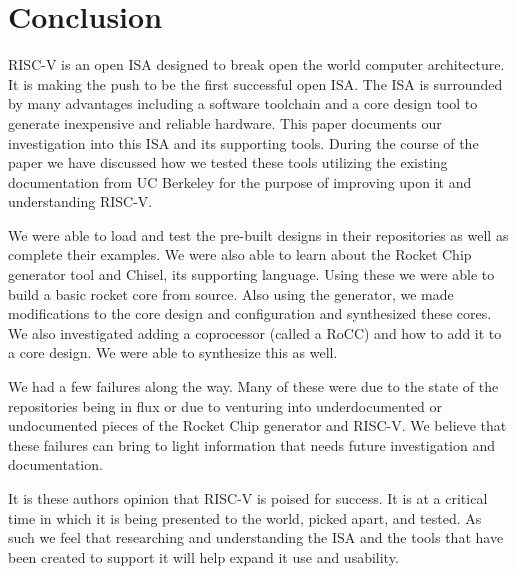 \documentclass[journal]{IEEEtran}
\begin{document}

\section{Conclusion}
RISC-V is an open ISA designed to break open the world computer architecture. It is making the push to be the first successful open ISA. The ISA is surrounded by many advantages including a software toolchain and a core design tool to generate inexpensive and reliable hardware. This paper documents our investigation into this ISA and its supporting tools. During the course of the paper we have discussed how we tested these tools utilizing the existing documentation from UC Berkeley for the purpose of improving upon it and understanding RISC-V.

We were able to load and test the pre-built designs in their repositories as well as complete their examples. We were also able to learn about the Rocket Chip generator tool and Chisel, its supporting language. Using these we were able to build a basic rocket core from source. Also using the generator, we made modifications to the core design and configuration and synthesized these cores. We also investigated adding a coprocessor (called a RoCC) and how to add it to a core design. We were able to synthesize this as well. 

We had a few failures along the way. Many of these were due to the state of the repositories being in flux or due to venturing into underdocumented or undocumented pieces of the Rocket Chip generator and RISC-V. We believe that these failures can bring to light information that needs future investigation and documentation. 

It is these authors opinion that RISC-V is poised for success. It is at a critical time in which it is being presented to the world, picked apart, and tested. As such we feel that researching and understanding the ISA and the tools that have been created to support it will help expand it use and usability.
\end{document}
